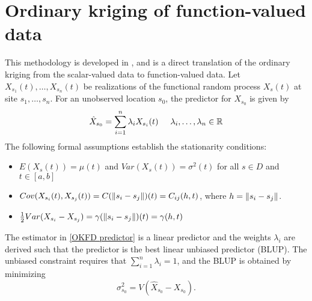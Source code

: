 %
%


\section{Ordinary kriging of function-valued data} %
\label{sec:ordinary_kriging_of_function_valued_data}
This methodology is developed in \cite{Giraldo:2010jx}, and is a direct translation of the ordinary kriging from the scalar-valued data to function-valued data. Let $X_{s_1}(t), \dots, X_{s_n}(t)$ be realizations of the functional random process $X_s(t)$ at site $s_1, \dots, s_n$. For an unobserved location $s_0$, the predictor for $X_{s_0}$ is given by 
\begin{equation}
	\hat{X}_{s_0} = \sum_{i=1}^n\lambda_i X_{s_i}(t) \mbox{\hspace{0.5cm}} \lambda_i, \dots, \lambda_n \in \mathbb{R} \label{OKFD predictor}
\end{equation}
The following formal assumptions establish the stationarity conditions:
\begin{itemize}
	\item $E(X_s(t)) = \mu(t)$ and $Var(X_s(t)) = \sigma^2(t)$ for all $s \in D$ and $t \in [a,b]$
	\item $Cov(X_{s_i}(t), X_{s_j}(t)) = C(\left\|s_i - s_j\right\|)(t) = C_{ij}(h,t)$, where $h = \left\|s_i - s_j\right\|$.
	\item $\frac{1}{2}Var(X_{s_i} - X_{s_j}) = \gamma(\left\|s_i - s_j\right\|)(t) = \gamma(h,t)$
\end{itemize}
The estimator in \eqref{OKFD predictor} is a linear predictor and the weights $\lambda_i$ are derived such that the predictor is the best linear unbiased predictor (BLUP). The unbiased constraint requires that $\sum_{i=1}^n\lambda_i = 1$, and the BLUP is obtained by minimizing
\begin{equation}
	\sigma^2_{s_0} = V(\hat{X}_{s_0} - X_{s_0}).
\end{equation}

